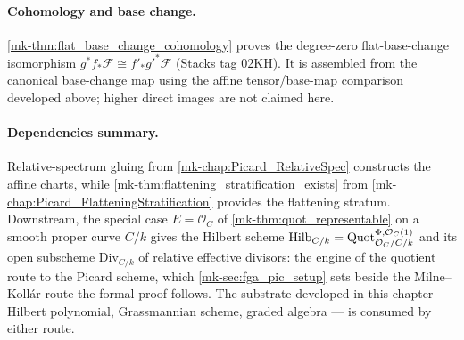 \paragraph{Cohomology and base change.}
\ref{mk-thm:flat_base_change_cohomology} proves the degree-zero flat-base-change
isomorphism \(g^*f_*\mathcal F\cong f'_*g'^*\mathcal F\) (Stacks tag 02KH).
It is assembled from the canonical base-change map using the affine
tensor/base-map comparison developed above; higher direct images are not
claimed here.

\paragraph{Dependencies summary.}
Relative-spectrum gluing from \ref{mk-chap:Picard_RelativeSpec} constructs
the affine charts, while
\ref{mk-thm:flattening_stratification_exists} from
\ref{mk-chap:Picard_FlatteningStratification} provides the flattening stratum.
Downstream, the special case \(E = \mathcal{O}_C\) of
\ref{mk-thm:quot_representable} on a smooth proper curve \(C/k\) gives the Hilbert
scheme \(\operatorname{Hilb}_{C/k} = \operatorname{Quot}^{\Phi,\mathcal{O}_C(1)}_{\mathcal{O}_C/C/k}\)
and its open subscheme \(\mathrm{Div}_{C/k}\) of relative effective divisors:
the engine of the quotient route to the Picard scheme, which
\ref{mk-sec:fga_pic_setup} sets beside the Milne--Koll\'ar route the formal proof
follows.  The substrate developed in this chapter --- Hilbert polynomial,
Grassmannian scheme, graded algebra --- is consumed by either route.

